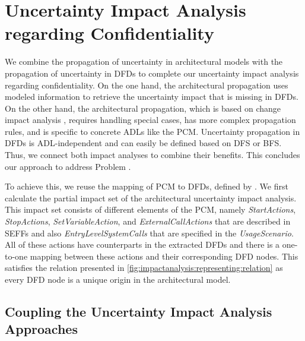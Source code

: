 \section{Uncertainty Impact Analysis regarding Confidentiality}%
\label{sec:impactanalysis:impactanalysis}

We combine the propagation of uncertainty in architectural models with the propagation of uncertainty in \acp{DFD} to complete our uncertainty impact analysis regarding confidentiality.
On the one hand, the architectural propagation uses modeled information to retrieve the uncertainty impact that is missing in \acp{DFD}.
On the other hand, the architectural propagation, which is based on change impact analysis \cite{rostami_architecture-based_2015,rostami_architecture-based_2015,busch_architecture-based_2020}, requires handling special cases, has more complex propagation rules, and is specific to concrete \acp{ADL} like the \ac{PCM}.
Uncertainty propagation in \acp{DFD} is \ac{ADL}-independent and can easily be defined based on \ac{DFS} or \ac{BFS}.
Thus, we connect both impact analyses to combine their benefits.
This concludes our approach to address Problem .

To achieve this, we reuse the mapping of \ac{PCM} to \acp{DFD}, defined by \textcite{seifermann_architectural_2022}.
We first calculate the partial impact set of the architectural uncertainty impact analysis.
This impact set consists of different elements of the \ac{PCM}, namely \emph{StartActions}, \emph{StopActions}, \emph{SetVariableAction}, and \emph{ExternalCallActions} that are described in \acp{SEFF} and also \emph{EntryLevelSystemCalls} that are specified in the \emph{UsageScenario}.
All of these actions have counterparts in the extracted \acp{DFD} and there is a one-to-one mapping between these actions and their corresponding \ac{DFD} nodes.
This satisfies the relation presented in \autoref{fig:impactanalysis:representing:relation} as every \ac{DFD} node is a unique origin in the architectural model.


\subsection{Coupling the Uncertainty Impact Analysis Approaches}

